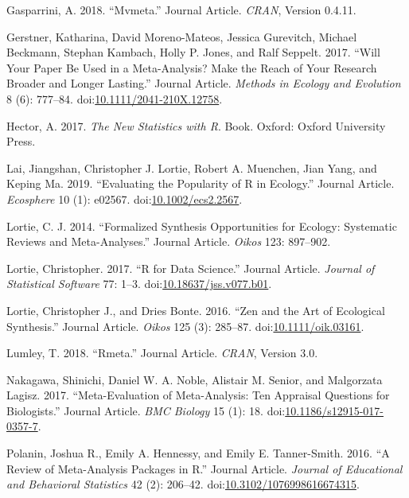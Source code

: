 \documentclass[fleqn,10pt]{wlpeerj} %
\begin{document}
\hypertarget{ref-RN6198}{}
Gasparrini, A. 2018. ``Mvmeta.'' Journal Article. \emph{CRAN}, Version
0.4.11.

\hypertarget{ref-RN4835}{}
Gerstner, Katharina, David Moreno-Mateos, Jessica Gurevitch, Michael
Beckmann, Stephan Kambach, Holly P. Jones, and Ralf Seppelt. 2017.
``Will Your Paper Be Used in a Meta-Analysis? Make the Reach of Your
Research Broader and Longer Lasting.'' Journal Article. \emph{Methods in
Ecology and Evolution} 8 (6): 777--84.
doi:\href{https://doi.org/10.1111/2041-210X.12758}{10.1111/2041-210X.12758}.

\hypertarget{ref-RN6087}{}
Hector, A. 2017. \emph{The New Statistics with R}. Book. Oxford: Oxford
University Press.

\hypertarget{ref-RN6098}{}
Lai, Jiangshan, Christopher J. Lortie, Robert A. Muenchen, Jian Yang,
and Keping Ma. 2019. ``Evaluating the Popularity of R in Ecology.''
Journal Article. \emph{Ecosphere} 10 (1): e02567.
doi:\href{https://doi.org/10.1002/ecs2.2567}{10.1002/ecs2.2567}.

\hypertarget{ref-RN3216}{}
Lortie, C. J. 2014. ``Formalized Synthesis Opportunities for Ecology:
Systematic Reviews and Meta-Analyses.'' Journal Article. \emph{Oikos}
123: 897--902.

\hypertarget{ref-RN4510}{}
Lortie, Christopher. 2017. ``R for Data Science.'' Journal Article.
\emph{Journal of Statistical Software} 77: 1--3.
doi:\href{https://doi.org/10.18637/jss.v077.b01}{10.18637/jss.v077.b01}.

\hypertarget{ref-RN3629}{}
Lortie, Christopher J., and Dries Bonte. 2016. ``Zen and the Art of
Ecological Synthesis.'' Journal Article. \emph{Oikos} 125 (3): 285--87.
doi:\href{https://doi.org/10.1111/oik.03161}{10.1111/oik.03161}.

\hypertarget{ref-RN6195}{}
Lumley, T. 2018. ``Rmeta.'' Journal Article. \emph{CRAN}, Version 3.0.

\hypertarget{ref-RN4850}{}
Nakagawa, Shinichi, Daniel W. A. Noble, Alistair M. Senior, and
Malgorzata Lagisz. 2017. ``Meta-Evaluation of Meta-Analysis: Ten
Appraisal Questions for Biologists.'' Journal Article. \emph{BMC
Biology} 15 (1): 18.
doi:\href{https://doi.org/10.1186/s12915-017-0357-7}{10.1186/s12915-017-0357-7}.

\hypertarget{ref-RN6178}{}
Polanin, Joshua R., Emily A. Hennessy, and Emily E. Tanner-Smith. 2016.
``A Review of Meta-Analysis Packages in R.'' Journal Article.
\emph{Journal of Educational and Behavioral Statistics} 42 (2): 206--42.
doi:\href{https://doi.org/10.3102/1076998616674315}{10.3102/1076998616674315}.
\end{document}
